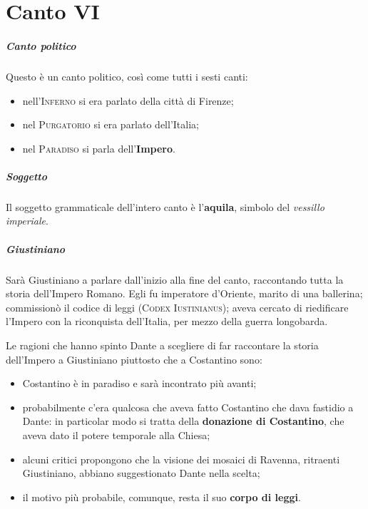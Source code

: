 \documentclass[a4paper, twoside, titlepage]{book}
\newcommand{\titolo}[1]{\textsc{#1}}
\newcounter{mar}
\begin{document}
\chapter{Canto VI}

\paragraph{Canto politico} Questo è un canto politico, così come tutti i sesti canti:
\begin{itemize}
\item nell'\titolo{Inferno} si era parlato della città di Firenze;
\item nel \titolo{Purgatorio} si era parlato dell'Italia;
\item nel \titolo{Paradiso} si parla dell'\textbf{Impero}.
\end{itemize}

\paragraph{Soggetto} Il soggetto grammaticale dell'intero canto è l'\textbf{aquila}, simbolo del \textit{vessillo imperiale}.

\paragraph{Giustiniano} Sarà Giustiniano a parlare dall'inizio alla fine del canto, raccontando tutta la storia dell'Impero Romano. Egli fu imperatore d'Oriente, marito di una ballerina; commissionò il codice di leggi (\titolo{Codex Iustinianus}); aveva cercato di riedificare l'Impero con la riconquista dell'Italia, per mezzo della guerra longobarda.

Le ragioni che hanno spinto Dante a scegliere di far raccontare la storia dell'Impero a Giustiniano piuttosto che a Costantino sono:
\begin{itemize}
\item Costantino è in paradiso e sarà incontrato più avanti;
\item probabilmente c'era qualcosa che aveva fatto Costantino che dava fastidio a Dante: in particolar modo si tratta della \textbf{donazione di Costantino}, che aveva dato il potere temporale alla Chiesa;
\item alcuni critici propongono che la visione dei mosaici di Ravenna, ritraenti Giustiniano, abbiano suggestionato Dante nella scelta;
\item il motivo più probabile, comunque, resta il suo \textbf{corpo di leggi}.
\end{itemize}
\end{document}
